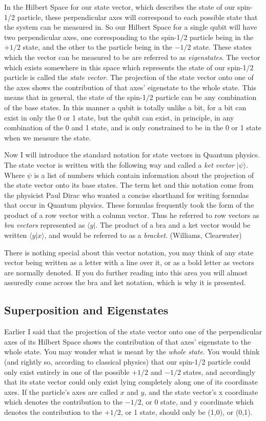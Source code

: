\documentclass[]{article}
\begin{document}
In the Hilbert Space for our state vector, which describes the state
of our spin-1/2 particle, these perpendicular axes will correspond to
each possible state that the system can be measured in.  So our
Hilbert Space for a single qubit will have two perpendicular axes, one
corresponding to the spin-1/2 particle being in the $+1/2$ state, and
the other to the particle being in the $-1/2$ state.  These states
which the vector can be measured to be are referred to as
\emph{eigenstates}.  The vector which exists somewhere in this space
which represents the state of our spin-1/2 particle is called the
\emph{state vector}.  The projection of the state vector onto one of
the axes shows the contribution of that axes' eigenstate to the whole
state.  This means that in general, the state of the spin-1/2 particle
can be any combination of the base states.  In this manner a qubit is
totally unlike a bit, for a bit can exist in only the 0 or 1 state,
but the qubit can exist, in principle, in any combination of the 0 and
1 state, and is only constrained to be in the 0 or 1 state when we
measure the state.

Now I will introduce the standard notation for state vectors in
Quantum physics.  The state vector is written with the following way
and called a \emph{ket vector} $|\psi \rangle$.  Where $\psi$ is a
list of numbers which contain information about the projection of the
state vector onto its base states.  The term ket and this notation
come from the physicist Paul Dirac who wanted a concise shorthand for
writing formulas that occur in Quantum physics.  These formulas
frequently took the form of the product of a row vector with a column
vector.  Thus he referred to row vectors as \emph{bra vectors}
represented as $\langle y|$.  The product of a bra and a ket vector
would be written $\langle y|x \rangle$, and would be referred to as a
\emph{bracket}.  (Williams, Clearwater)

There is nothing special about this vector notation, you may think of
any state vector being written as a letter with a line over it, or as
a bold letter as vectors are normally denoted.  If you do further
reading into this area you will almost assuredly come across the bra
and ket notation, which is why it is presented.

\subsection{Superposition and Eigenstates}

Earlier I said that the projection of the state vector onto one of the
perpendicular axes of its Hilbert Space shows the contribution of that
axes' eigenstate to the whole state.  You may wonder what is meant by
the \emph{whole state}.  You would think (and rightly so, according to
classical physics) that our spin-1/2 particle could only exist
entirely in one of the possible $+1/2$ and $-1/2$ states, and
accordingly that its state vector could only exist lying completely
along one of its coordinate axes.  If the particle's axes are called
$x$ and $y$, and the state vector's x coordinate which denotes the
contribution to the $-1/2$, or 0 state, and y coordinate which denotes
the contribution to the $+1/2$, or 1 state, should only be (1,0), or
(0,1).
\end{document}
